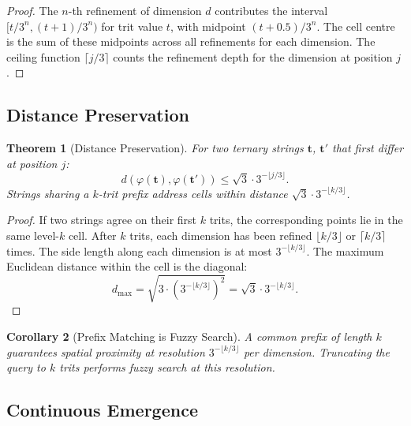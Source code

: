 \documentclass[11pt,a4paper]{article}
\newtheorem{theorem}{Theorem}[section]
\newtheorem{corollary}[theorem]{Corollary}
\theoremstyle{definition}
\theoremstyle{remark}
\begin{document}
\begin{proof}
The $n$-th refinement of dimension $d$ contributes the interval $[t/3^n, (t+1)/3^n)$ for trit value $t$, with midpoint $(t + 0.5)/3^n$. The cell centre is the sum of these midpoints across all refinements for each dimension. The ceiling function $\lceil j/3 \rceil$ counts the refinement depth for the dimension at position $j$.
\end{proof}

\subsection{Distance Preservation}

\begin{theorem}[Distance Preservation]
\label{thm:distance}
For two ternary strings $\mathbf{t}$, $\mathbf{t}'$ that first differ at position $j$:
\begin{equation}
d(\varphi(\mathbf{t}), \varphi(\mathbf{t}')) \leq \sqrt{3} \cdot 3^{-\lfloor j/3 \rfloor}.
\label{eq:distance_bound}
\end{equation}
Strings sharing a $k$-trit prefix address cells within distance $\sqrt{3} \cdot 3^{-\lfloor k/3 \rfloor}$.
\end{theorem}

\begin{proof}
If two strings agree on their first $k$ trits, the corresponding points lie in the same level-$k$ cell. After $k$ trits, each dimension has been refined $\lfloor k/3 \rfloor$ or $\lceil k/3 \rceil$ times. The side length along each dimension is at most $3^{-\lfloor k/3 \rfloor}$. The maximum Euclidean distance within the cell is the diagonal:
\begin{equation}
d_{\max} = \sqrt{3 \cdot (3^{-\lfloor k/3 \rfloor})^2} = \sqrt{3} \cdot 3^{-\lfloor k/3 \rfloor}.
\end{equation}
\end{proof}

\begin{corollary}[Prefix Matching is Fuzzy Search]
\label{cor:prefix_fuzzy}
A common prefix of length $k$ guarantees spatial proximity at resolution $3^{-\lfloor k/3 \rfloor}$ per dimension. Truncating the query to $k$ trits performs fuzzy search at this resolution.
\end{corollary}

\subsection{Continuous Emergence}
\end{document}
